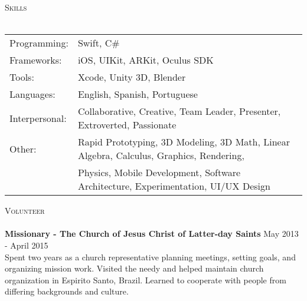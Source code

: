 \documentclass[a4paper]{article}
\newcommand{\lineunder} {
    \vspace*{-8pt} \\
    \hspace*{-18pt} \hrulefill \\
}
\newcommand{\header} [1] {
    {\hspace*{-18pt}\vspace*{6pt} \textsc{#1}}
    \vspace*{-6pt} \lineunder
}
\begin{document}
\vspace*{2mm}

\header{Skills}
\begin{tabular}{ l l }
	Programming: & Swift, C\#\\
	Frameworks: & iOS, UIKit, ARKit, Oculus SDK\\
	Tools: & Xcode, Unity 3D, Blender\\
	Languages: & English, Spanish, Portuguese\\
	Interpersonal: & Collaborative, Creative, Team Leader, Presenter, Extroverted, Passionate\\
	Other: & Rapid Prototyping, 3D Modeling, 3D Math, Linear Algebra, Calculus, Graphics, Rendering, \\
	& Physics, Mobile Development, Software Architecture, Experimentation, UI/UX Design\\
\end{tabular}
\vspace{2mm}

\header{Volunteer}
\textbf{Missionary - The Church of Jesus Christ of Latter-day Saints} \hfill May 2013 - April 2015\\
Spent two years as a church representative planning meetings, setting goals, and organizing mission work. Visited the needy and helped maintain church organization in Espirito Santo, Brazil. Learned to cooperate with people from differing backgrounds and culture.\\
\vspace*{2mm}

\ 
\end{document}
